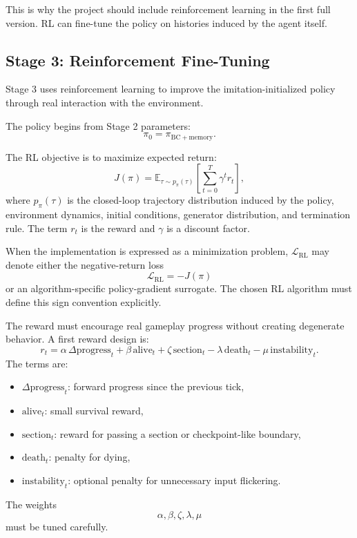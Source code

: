 \documentclass[11pt]{article}
\newcommand{\RL}{\mathrm{RL}}
\begin{document}
This is why the project should include reinforcement learning in the first full version. RL can fine-tune the policy on histories induced by the agent itself.

\subsection{Stage 3: Reinforcement Fine-Tuning}

Stage 3 uses reinforcement learning to improve the imitation-initialized policy through real interaction with the environment.

The policy begins from Stage 2 parameters:
\[
  \pi_0 = \pi_{\mathrm{BC+memory}}.
\]

The RL objective is to maximize expected return:
\[
  J(\pi)
  =
  \mathbb{E}_{\tau \sim p_\pi(\tau)}
  \left[
    \sum_{t=0}^{T}\gamma^t r_t
  \right],
\]
where \(p_\pi(\tau)\) is the closed-loop trajectory distribution induced by the policy, environment dynamics, initial conditions, generator distribution, and termination rule. The term \(r_t\) is the reward and \(\gamma\) is a discount factor.

When the implementation is expressed as a minimization problem, \(\mathcal{L}_{\RL}\) may denote either the negative-return loss
\[
  \mathcal{L}_{\RL} = -J(\pi)
\]
or an algorithm-specific policy-gradient surrogate. The chosen RL algorithm must define this sign convention explicitly.

The reward must encourage real gameplay progress without creating degenerate behavior. A first reward design is:
\[
  r_t
  =
  \alpha\,\Delta\mathrm{progress}_t
  +
  \beta\,\mathrm{alive}_t
  +
  \zeta\,\mathrm{section}_t
  -
  \lambda\,\mathrm{death}_t
  -
  \mu\,\mathrm{instability}_t.
\]
The terms are:
\begin{itemize}
  \item \(\Delta\mathrm{progress}_t\): forward progress since the previous tick,
  \item \(\mathrm{alive}_t\): small survival reward,
  \item \(\mathrm{section}_t\): reward for passing a section or checkpoint-like boundary,
  \item \(\mathrm{death}_t\): penalty for dying,
  \item \(\mathrm{instability}_t\): optional penalty for unnecessary input flickering.
\end{itemize}

The weights
\[
  \alpha,\beta,\zeta,\lambda,\mu
\]
must be tuned carefully.
\end{document}
